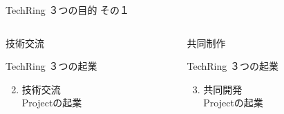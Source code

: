 \documentclass[dvipdfmx]{beamer}
\begin{document}
\begin{frame}{TechRing ３つの目的 その１}
\begin{columns}
    \begin{column}{0.30\textwidth}
      \begin{block}{技術交流}
        \begin{footnotesize}
          TechRing ３つの起業
          \begin{enumerate}
            \setcounter{enumi}{1}
            \item 技術交流\\Projectの起業
          \end{enumerate}
        \end{footnotesize}
      \end{block}
    \end{column}

    \begin{column}{0.30\textwidth}
      \begin{block}{共同制作}
        \begin{footnotesize}
          TechRing ３つの起業 \par
          \begin{enumerate}
            \setcounter{enumi}{2}
            \item 共同開発\\Projectの起業
          \end{enumerate}
        \end{footnotesize}
      \end{block}
    \end{column}
  \end{columns}
\end{frame}
\end{document}
